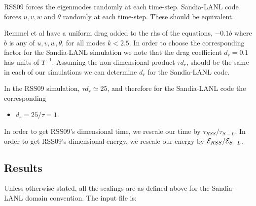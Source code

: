 \documentclass[12pt]{article}
\begin{document}
RSS09 forces the eigenmodes randomly at each time-step. Sandia-LANL
code forces $u,v,w$ and $\theta$ randomly at each time-step. These
should be equivalent.

Remmel et al have a uniform drag added to the rhs of the equations, 
$-0.1 b$ where $b$ is any
of $u,v,w,\theta$, for all modes $k < 2.5$. In order to choose the
corresponding factor for the Sandia-LANL simulation we note that the
drag coefficient $d_r = 0.1$ has units of $T^{-1}$. Assuming the
non-dimensional product $\tau d_r$, should be the same in each of our
simulations we can determine $d_r$ for the Sandia-LANL code. 

In the RSS09 simulation, $\tau d_r \simeq 25$, and
therefore for the Sandia-LANL code the corresponding 
\begin{itemize}
\item $d_r = 25/\tau = 1$.
\end{itemize}
In order to get RSS09's dimensional time, we rescale our time by
$\tau_{RSS}/\tau_{S-L}$. In order to get RSS09's dimensional energy,
we rescale our energy by ${\cal E}_{RSS}/{\cal E}_{S-L}$.

\subsection{Results}
Unless otherwise stated, all the scalings are as defined above for the
Sandia-LANL domain convention. The input file is:
\end{document}
